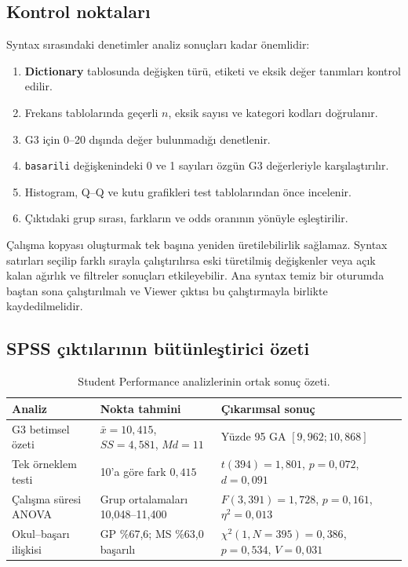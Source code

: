 \subsection{Kontrol noktaları}

Syntax sırasındaki denetimler analiz sonuçları kadar önemlidir:

\begin{enumerate}
  \item \textbf{Dictionary} tablosunda değişken türü, etiketi ve eksik değer tanımları kontrol edilir.
  \item Frekans tablolarında geçerli $n$, eksik sayısı ve kategori kodları doğrulanır.
  \item G3 için 0--20 dışında değer bulunmadığı denetlenir.
  \item \texttt{basarili} değişkenindeki 0 ve 1 sayıları özgün G3 değerleriyle karşılaştırılır.
  \item Histogram, Q--Q ve kutu grafikleri test tablolarından önce incelenir.
  \item Çıktıdaki grup sırası, farkların ve odds oranının yönüyle eşleştirilir.
\end{enumerate}

\begin{mistakebox}
Çalışma kopyası oluşturmak tek başına yeniden üretilebilirlik sağlamaz.
Syntax satırları seçilip farklı sırayla çalıştırılırsa eski türetilmiş
değişkenler veya açık kalan ağırlık ve filtreler sonuçları etkileyebilir.
Ana syntax temiz bir oturumda baştan sona çalıştırılmalı ve Viewer çıktısı bu
çalıştırmayla birlikte kaydedilmelidir.
\end{mistakebox}

\subsection{SPSS çıktılarının bütünleştirici özeti}

\begin{table}[htbp]
\centering
\caption{Student Performance analizlerinin ortak sonuç özeti.}
\begingroup\small
\begin{tabular}{@{}p{}p{}p{}@{}}
\toprule
Analiz & Nokta tahmini & Çıkarımsal sonuç \\
\midrule
G3 betimsel özeti & $\bar x=10{,}415$, $SS=4{,}581$, $Md=11$ & Yüzde 95 GA $[9{,}962;10{,}868]$ \\
Tek örneklem testi & 10'a göre fark $0{,}415$ & $t(394)=1{,}801$, $p=0{,}072$, $d=0{,}091$ \\
Çalışma süresi ANOVA & Grup ortalamaları 10,048--11,400 & $F(3,391)=1{,}728$, $p=0{,}161$, $\eta^2=0{,}013$ \\
Okul--başarı ilişkisi & GP \%67,6; MS \%63,0 başarılı & $\chi^2(1,N=395)=0{,}386$, $p=0{,}534$, $V=0{,}031$ \\
\bottomrule
\end{tabular}
\endgroup
\end{table}

